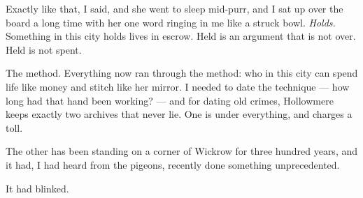 Exactly like that, I said, and she went to sleep mid-purr, and I sat up over the board a long time with her one word ringing in me like a struck bowl. \emph{Holds.} Something in this city holds lives in escrow. Held is an argument that is not over. Held is not spent.

The method. Everything now ran through the method: who in this city can spend life like money and stitch like her mirror. I needed to date the technique --- how long had that hand been working? --- and for dating old crimes, Hollowmere keeps exactly two archives that never lie. One is under everything, and charges a toll.

The other has been standing on a corner of Wickrow for three hundred years, and it had, I had heard from the pigeons, recently done something unprecedented.

It had blinked.
